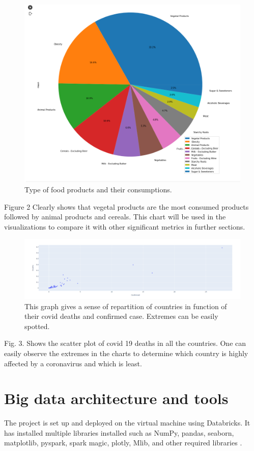 \documentclass[journal,twoside,web]{ieeecolor}
\begin{document}
\begin{figure}[!t]
\centerline{\includegraphics[width=\columnwidth]{profig1.png}}
\caption{Type of food products and their consumptions.}
\label{fig1}
\end{figure}

Figure 2 Clearly shows that vegetal products are the most consumed products followed by animal products and cereals. This chart will be used in the visualizations to compare it with other significant metrics in further sections.

\begin{figure}[!t]
\centerline{\includegraphics[width=\columnwidth]{progif2.png}}
\caption{This graph gives a sense of repartition of countries in function of their covid deaths and confirmed case. Extremes can be easily spotted.}
\label{fig1}
\end{figure}

Fig. 3.  Shows the scatter plot of covid 19 deaths in all the countries. One can easily observe the extremes in the charts to determine which country is highly affected by a coronavirus and which is least.

\section{Big data architecture and tools}
The project is set up and deployed on the virtual machine using Databricks. It has installed multiple libraries installed such as NumPy, pandas, seaborn, matplotlib, pyspark, spark magic, plotly, Mlib, and other required libraries \cite{drabas2017learning}.
\end{document}
